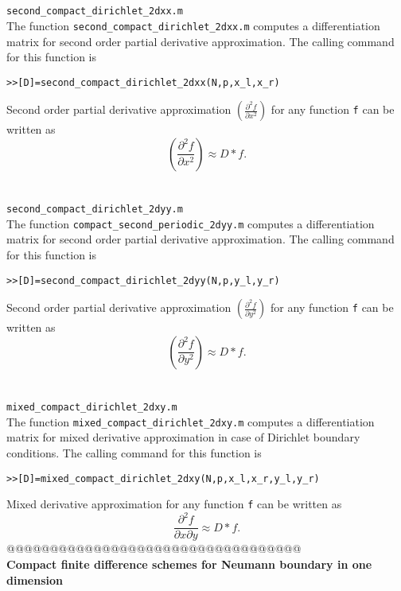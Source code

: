 \documentclass[acmtoms]{acmtrans2m}
\begin{document}
\section{} \verb#second_compact_dirichlet_2dxx.m#\\
 The function \verb#second_compact_dirichlet_2dxx.m# computes a differentiation matrix for second order partial derivative approximation. The calling command for this function is
\begin{alltt}
>>[D]=second_compact_dirichlet_2dxx(N,p,x_l,x_r)
\end{alltt}
Second order partial derivative approximation $\left(\frac{\partial^2 f}{\partial x^2}\right)$ for any function \verb#f# can be written as
\[
\left(\frac{\partial^2 f}{\partial x^2}\right)\approx D*f.
\]
\section{} \verb#second_compact_dirichlet_2dyy.m#\\
 The function \verb#compact_second_periodic_2dyy.m# computes a differentiation matrix for second order partial derivative approximation. The calling command for this function is
\begin{alltt}
>>[D]=second_compact_dirichlet_2dyy(N,p,y_l,y_r)
\end{alltt}
Second order partial derivative approximation $\left(\frac{\partial^2 f}{\partial y^2}\right)$ for any function \verb#f# can be written as
\[
\left(\frac{\partial^2 f}{\partial y^2}\right)\approx D*f.
\]
\section{} \verb#mixed_compact_dirichlet_2dxy.m#\\
The function \verb#mixed_compact_dirichlet_2dxy.m# computes a differentiation matrix for mixed derivative approximation in case of Dirichlet boundary conditions. The calling command for this function is
\begin{alltt}
>>[D]=mixed_compact_dirichlet_2dxy(N,p,x_l,x_r,y_l,y_r)
\end{alltt}
Mixed derivative approximation for any function \verb#f# can be written as
\[
\frac{\partial^2 f}{\partial x \partial y}\approx D*f.
\]
@@@@@@@@@@@@@@@@@@@@@@@@@@@@@@@@@@\\
\textbf{Compact finite difference schemes for Neumann boundary in one dimension}\\
\end{document}
